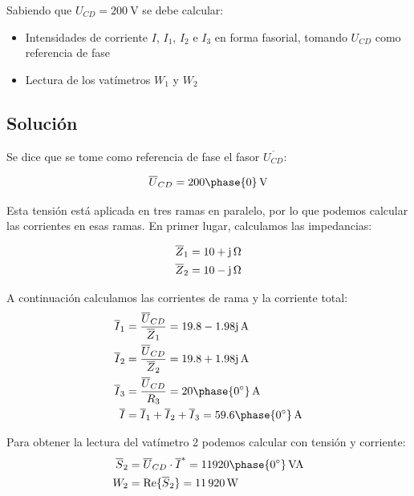 Sabiendo que $U_{CD} = \qty{200}{\volt}$ se debe calcular:
\begin{itemize}
\item Intensidades de corriente $I$, $I_1$, $I_2$ e $I_3$ {en forma
    fasorial}, tomando $U_{CD}$ como referencia de fase
\item Lectura de los vatímetros $W_1$ y $W_2$
\end{itemize}

\subsection*{Solución}

Se dice que se tome como referencia de fase el fasor
$\overline{U_{CD}}$:

  \begin{equation*}
    \overline{U}_{CD} = \qty[parse-numbers=false]{200\phase{0}}{\volt}
  \end{equation*}

  
  Esta tensión está aplicada en tres ramas en paralelo, por lo que podemos calcular las corrientes en esas ramas. En primer lugar, calculamos las impedancias:

\begin{align*}
\overline{Z}_1 &= \qty[parse-numbers=false]{10 + \mathrm{j}}{\ohm}\\
%
\overline{Z}_2 &= \qty[parse-numbers=false]{10 - \mathrm{j}}{\ohm}
\end{align*}

A continuación calculamos las corrientes de rama y la corriente total:
\begin{align*}
\overline{I}_1 &= \frac{\overline{U}_{CD}}{\overline{Z}_1} = \qty[parse-numbers=false]{19.8 - 1.98\mathrm{j}}{\ampere}\\
%
\overline{I}_2 &= \frac{\overline{U}_{CD}}{\overline{Z}_2} = \qty[parse-numbers=false]{19.8 + 1.98\mathrm{j}}{\ampere}\\
%
\overline{I}_3 &= \frac{\overline{U}_{CD}}{R_3} = \qty[parse-numbers=false]{20\phase{\ang{0}}}{\ampere}\\
%
\overline{I} &= \overline{I}_1 + \overline{I}_2 + \overline{I}_3 =  \qty[parse-numbers=false]{59.6\phase{\ang{0}}}{\ampere}\\
\end{align*}

Para obtener la lectura del vatímetro 2 podemos calcular con tensión y corriente:
  \begin{align*}
\overline{S}_2 &= \overline{U}_{CD} \cdot \overline{I}^* = \qty[parse-numbers=false]{11920\phase{\ang{0}}}{VA}\\
%
W_2 &= \mathrm{Re}\{\overline{S}_2\} = \qty{11920}{\watt}
\end{align*}


